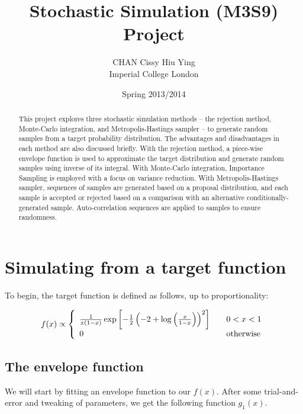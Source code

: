 \documentclass[11pt, a4paper]{article}
\title{Stochastic Simulation (M3S9) Project}
\author{CHAN Cissy Hiu Ying \\ Imperial College London}
\date{Spring 2013/2014}
\begin{document}
\vspace*{4cm}
{\let\newpage\relax\maketitle}
\newpage

\newpage
\tableofcontents

\newpage

\begin{abstract}
This project explores three stochastic simulation methods -- the rejection method, Monte-Carlo integration, and Metropolis-Hastings sampler -- to generate random samples from a target probability distribution. The advantages and disadvantages in each method are also discussed briefly. With the rejection method, a piece-wise envelope function is used to approximate the target distribution and generate random samples using inverse of its integral. With Monte-Carlo integration, Importance Sampling is employed with a focus on variance reduction. With Metropolis-Hastings sampler, sequences of samples are generated based on a proposal distribution, and each sample is accepted or rejected based on a comparison with an alternative conditionally-generated sample. Auto-correlation sequences are applied to samples to ensure randomness.

\end{abstract}

\newpage

\section{Simulating from a target function}

To begin, the target function is defined as follows, up to proportionality:

\[ f(x) \propto \left\{ 
\begin{array}{l l}
\frac1{x(1-x)} \exp \left[ -\frac12 \left( -2 + \log \left( \frac{x}{1-x} \right) \right)^2 \right] & \quad  0 < x < 1\\
0 & \quad \text{otherwise} \\
\end{array} \right.\]

\subsection{The envelope function}

We will start by fitting an envelope function to our $f(x)$. After some trial-and-error and tweaking of parameters, we get the following function $g_1(x)$.
\end{document}
